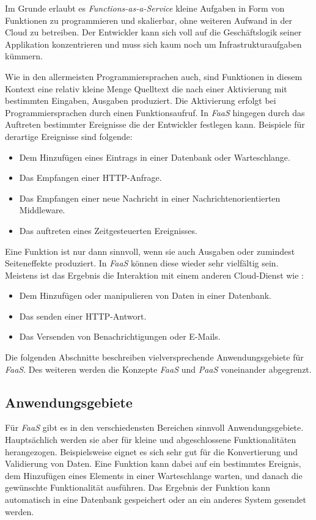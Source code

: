 Im Grunde erlaubt es \textit{Functions-as-a-Service} kleine Aufgaben in Form von Funktionen zu programmieren und skalierbar, ohne weiteren Aufwand in der Cloud zu betreiben. Der Entwickler kann sich voll auf die Geschäftslogik seiner Applikation konzentrieren und muss sich kaum noch um Infrastrukturaufgaben kümmern.

Wie in den allermeisten Programmiersprachen auch, sind Funktionen in diesem Kontext eine relativ kleine Menge Quelltext die nach einer Aktivierung mit bestimmten Eingaben, Ausgaben produziert. Die Aktivierung erfolgt bei Programmiersprachen durch einen Funktionsaufruf. In \textit{FaaS} hingegen durch das Auftreten bestimmter Ereignisse die der Entwickler festlegen kann. Beispiele für derartige Ereignisse sind folgende:

\begin{itemize}
	\item Dem Hinzufügen eines Eintrags in einer Datenbank oder Warteschlange.
	\item Das Empfangen einer HTTP-Anfrage.
	\item Das Empfangen einer neue Nachricht in einer Nachrichtenorientierten Middleware.
	\item Das auftreten eines Zeitgesteuerten Ereignisses.
\end{itemize}

Eine Funktion ist nur dann sinnvoll, wenn sie auch Ausgaben oder zumindest Seiteneffekte produziert. In \textit{FaaS} können diese wieder sehr vielfältig sein. Meistens ist das Ergebnis die Interaktion mit einem anderen Cloud-Dienst wie \zB:

\begin{itemize}
	\item Dem Hinzufügen oder manipulieren von Daten in einer Datenbank.
	\item Das senden einer HTTP-Antwort.
	\item Das Versenden von Benachrichtigungen oder E-Mails.
\end{itemize}

Die folgenden Abschnitte beschreiben vielversprechende Anwendungsgebiete für \textit{FaaS}. Des weiteren werden die Konzepte \textit{FaaS} und \textit{PaaS} voneinander abgegrenzt.

\subsection{Anwendungsgebiete}

Für \textit{FaaS} gibt es in den verschiedensten Bereichen sinnvoll Anwendungsgebiete. Hauptsächlich werden sie aber für kleine und abgeschlossene Funktionalitäten herangezogen. Beispielsweise eignet es sich sehr gut für die Konvertierung und Validierung von Daten. Eine Funktion kann dabei auf ein bestimmtes Ereignis, \zB dem Hinzufügen eines Elements in einer Warteschlange warten, und danach die gewünschte Funktionalität ausführen. Das Ergebnis der Funktion kann \zB automatisch in eine Datenbank gespeichert oder an ein anderes System gesendet werden.

